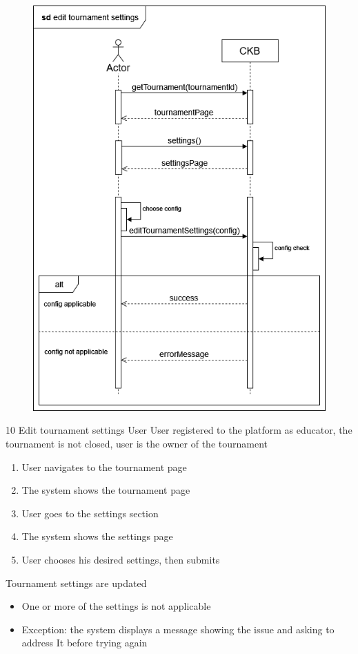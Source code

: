 \usecase
{
    \begin{figure}[H]
        \centering
        \includegraphics[width=\textwidth]{src/sd_diagrams/managetournsetts.png}
    \end{figure}
}
{10}
{Edit tournament settings} %
{User} %
{User registered to the platform as educator, the tournament is not closed, user is the owner of the tournament} %
{ %
    \begin{enumerate}
        \item User navigates to the tournament page
        \item The system shows the tournament page
        \item User goes to the settings section
        \item The system shows the settings page
        \item User chooses his desired settings, then submits
    \end{enumerate}
}
{Tournament settings are updated} %
{ %
    \begin{itemize}
        \item One or more of the settings is not applicable
    \end{itemize}
}
{ %
    \begin{itemize}
        \item Exception: the system displays a message showing the issue and asking to address It before trying again
    \end{itemize}
}

